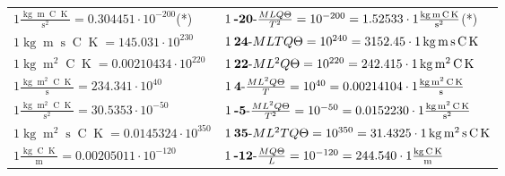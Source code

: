 \begin{center}
\begin{longtable}{l l}
{\color{black}$1 \bm{\mathrm{ }}\frac{\operatorname{kg}\operatorname{m}\operatorname{C}\operatorname{K}}{\operatorname{s}^2} = 0.304451\cdot10^{-200} $}\quad(*)&
	{\color{black}$1\:\text{\textbf{-20}-} \frac{MLQ\Theta}{T^2}=10^{-200} = 1.52533 \cdot 1 \bm{\mathrm{ }}\frac{\operatorname{kg}\operatorname{m}\operatorname{C}\operatorname{K}}{\operatorname{s}^2}$}\quad(*)\\
{\color{black}$1 \bm{\mathrm{ }}\operatorname{kg}\operatorname{m}\operatorname{s}\operatorname{C}\operatorname{K} = 145.031\cdot10^{230} $}&
	{\color{black}$1\:\text{\textbf{24}-} MLTQ\Theta=10^{240} = 3152.45 \cdot 1 \bm{\mathrm{ }}\operatorname{kg}\operatorname{m}\operatorname{s}\operatorname{C}\operatorname{K}$}\\
{\color{black}$1 \bm{\mathrm{ }}\operatorname{kg}\operatorname{m}^2\operatorname{C}\operatorname{K} = 0.00210434\cdot10^{220} $}&
	{\color{black}$1\:\text{\textbf{22}-} ML^2Q\Theta=10^{220} = 242.415 \cdot 1 \bm{\mathrm{ }}\operatorname{kg}\operatorname{m}^2\operatorname{C}\operatorname{K}$}\\
{\color{black}$1 \bm{\mathrm{ }}\frac{\operatorname{kg}\operatorname{m}^2\operatorname{C}\operatorname{K}}{\operatorname{s}} = 234.341\cdot10^{40} $}&
	{\color{black}$1\:\text{\textbf{4}-} \frac{ML^2Q\Theta}{T}=10^{40} = 0.00214104 \cdot 1 \bm{\mathrm{ }}\frac{\operatorname{kg}\operatorname{m}^2\operatorname{C}\operatorname{K}}{\operatorname{s}}$}\\
{\color{black}$1 \bm{\mathrm{ }}\frac{\operatorname{kg}\operatorname{m}^2\operatorname{C}\operatorname{K}}{\operatorname{s}^2} = 30.5353\cdot10^{-50} $}&
	{\color{black}$1\:\text{\textbf{-5}-} \frac{ML^2Q\Theta}{T^2}=10^{-50} = 0.0152230 \cdot 1 \bm{\mathrm{ }}\frac{\operatorname{kg}\operatorname{m}^2\operatorname{C}\operatorname{K}}{\operatorname{s}^2}$}\\
{\color{black}$1 \bm{\mathrm{ }}\operatorname{kg}\operatorname{m}^2\operatorname{s}\operatorname{C}\operatorname{K} = 0.0145324\cdot10^{350} $}&
	{\color{black}$1\:\text{\textbf{35}-} ML^2TQ\Theta=10^{350} = 31.4325 \cdot 1 \bm{\mathrm{ }}\operatorname{kg}\operatorname{m}^2\operatorname{s}\operatorname{C}\operatorname{K}$}\\
{\color{black}$1 \bm{\mathrm{ }}\frac{\operatorname{kg}\operatorname{C}\operatorname{K}}{\operatorname{m}} = 0.00205011\cdot10^{-120} $}&
	{\color{black}$1\:\text{\textbf{-12}-} \frac{MQ\Theta}{L}=10^{-120} = 244.540 \cdot 1 \bm{\mathrm{ }}\frac{\operatorname{kg}\operatorname{C}\operatorname{K}}{\operatorname{m}}$}\\

\end{longtable}
\end{center}
